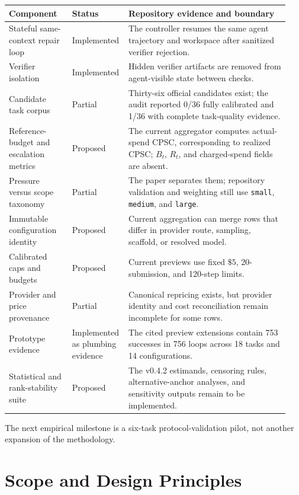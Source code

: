 \documentclass[11pt]{article}
\begin{document}
\begin{longtable}{@{}p{0.22\linewidth}p{0.16\linewidth}p{0.56\linewidth}@{}}
\toprule
Component & Status & Repository evidence and boundary\\
\hline
Stateful same-context repair loop & Implemented & The controller resumes the same agent trajectory and workspace after sanitized verifier rejection.\\
Verifier isolation & Implemented & Hidden verifier artifacts are removed from agent-visible state between checks.\\
Candidate task corpus & Partial & Thirty-six official candidates exist; the audit reported 0/36 fully calibrated and 1/36 with complete task-quality evidence.\\
Reference-budget and escalation metrics & Proposed & The current aggregator computes actual-spend CPSC, corresponding to realized CPSC; $B_t$, $R_t$, and charged-spend fields are absent.\\
Pressure versus scope taxonomy & Partial & The paper separates them; repository validation and weighting still use \texttt{small}, \texttt{medium}, and \texttt{large}.\\
Immutable configuration identity & Proposed & Current aggregation can merge rows that differ in provider route, sampling, scaffold, or resolved model.\\
Calibrated caps and budgets & Proposed & Current previews use fixed $\$5$, 20-submission, and 120-step limits.\\
Provider and price provenance & Partial & Canonical repricing exists, but provider identity and cost reconciliation remain incomplete for some rows.\\
Prototype evidence & Implemented as plumbing evidence & The cited preview extensions contain 753 successes in 756 loops across 18 tasks and 14 configurations.\\
Statistical and rank-stability suite & Proposed & The v0.4.2 estimands, censoring rules, alternative-anchor analyses, and sensitivity outputs remain to be implemented.\\
\hline
\end{longtable}

The next empirical milestone is a six-task protocol-validation pilot, not another expansion of the methodology.

\section{Scope and Design Principles}\hypertarget{2-scope-and-design-principles}{}\label{2-scope-and-design-principles}
\end{document}

